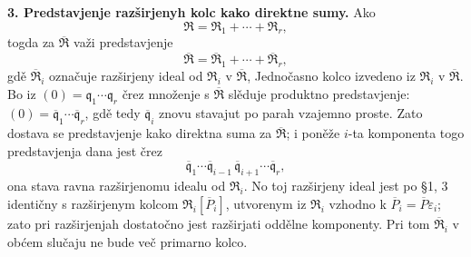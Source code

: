 \documentclass[11pt]{article}
\begin{document}
\setcounter{footnote}{20}

\textbf{3. Predstavjenje razširjenyh kolc kako direktne sumy.} Ako
\[
   \mathfrak R=\mathfrak R_1+\cdots+\mathfrak R_r,
\]
togda za $\overline{\mathfrak R}$ važi predstavjenje
\[
   \overline{\mathfrak R}=\overline{\mathfrak R}_1+\cdots+\overline{\mathfrak R}_r,
\]
gdě $\overline{\mathfrak R}_i$ označuje razširjeny ideal od $\mathfrak R_i$ v $\overline{\mathfrak R}$, Jednočasno kolco izvedeno iz $\mathfrak R_i$ v $\overline{\mathfrak R}$. Bo iz $(0)=\mathfrak q_1\cdots\mathfrak q_r$ črez množenje s $\overline{\mathfrak R}$ slěduje produktno predstavjenje: $(0)=\overline{\mathfrak q}_1\cdots\overline{\mathfrak q}_r$, gdě tedy $\overline{\mathfrak q}_i$ znovu stavajut po parah vzajemno proste. Zato dostava se predstavjenje kako direktna suma za $\overline{\mathfrak R}$; i poněže $i$-ta komponenta togo predstavjenja dana jest črez
\[
   \overline{\mathfrak q}_1\cdots\overline{\mathfrak q}_{i-1}\,
   \overline{\mathfrak q}_{i+1}\cdots\overline{\mathfrak q}_r,
\]
ona stava ravna razširjenomu idealu od $\mathfrak R_i$. No toj razširjeny ideal jest po \S 1, 3 identičny s razširjenym kolcom $\mathfrak R_i[\overline P_i]$, utvorenym iz $\mathfrak R_i$ vzhodno k $\overline P_i=\overline P\varepsilon_i$; zato pri razširjenjah dostatočno jest razširjati oddělne komponenty. Pri tom $\overline{\mathfrak R}_i$ v obćem slučaju ne bude več primarno kolco.
\end{document}
